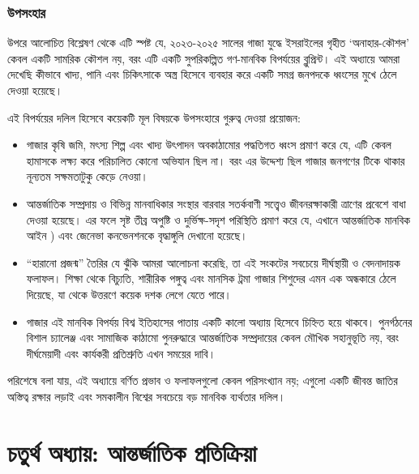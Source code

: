 \subsubsection{উপসংহার}\label{ux989ux9aaux9b8ux9b9ux9b0-ux98fux995ux99f-ux997ux9a3-ux9aeux9a8ux9acux995-ux9acux9aaux9b0ux9afux9dfux9b0-ux9a6ux9b2ux9b2}

উপরে আলোচিত বিশ্লেষণ থেকে এটি স্পষ্ট যে, ২০২৩-২০২৫ সালের গাজা যুদ্ধে ইসরাইলের
গৃহীত `অনাহার-কৌশল' কেবল একটি সামরিক কৌশল নয়, বরং এটি একটি সুপরিকল্পিত
গণ-মানবিক বিপর্যয়ের ব্লুপ্রিন্ট। এই অধ্যায়ে আমরা দেখেছি কীভাবে খাদ্য, পানি এবং
চিকিৎসাকে অস্ত্র হিসেবে ব্যবহার করে একটি সমগ্র জনপদকে ধ্বংসের মুখে ঠেলে দেওয়া
হয়েছে।

এই বিপর্যয়ের দলিল হিসেবে কয়েকটি মূল বিষয়কে উপসংহারে গুরুত্ব দেওয়া প্রয়োজন:

\begin{itemize}
\item
  গাজার কৃষি জমি, মৎস্য শিল্প এবং খাদ্য উৎপাদন
  অবকাঠামোর পদ্ধতিগত ধ্বংস প্রমাণ করে যে, এটি কেবল হামাসকে লক্ষ্য করে
  পরিচালিত কোনো অভিযান ছিল না। বরং এর উদ্দেশ্য ছিল গাজার জনগণের টিকে থাকার
  নূন্যতম সক্ষমতাটুকু কেড়ে নেওয়া।
\item
  আন্তর্জাতিক সম্প্রদায় ও বিভিন্ন মানবাধিকার
  সংস্থার বারবার সতর্কবাণী সত্ত্বেও জীবনরক্ষাকারী ত্রাণের প্রবেশে বাধা দেওয়া
  হয়েছে। এর ফলে সৃষ্ট তীব্র অপুষ্টি ও দুর্ভিক্ষ-সদৃশ পরিস্থিতি প্রমাণ করে যে, এখানে
  আন্তর্জাতিক মানবিক আইন ) এবং জেনেভা কনভেনশনকে বৃদ্ধাঙ্গুলি দেখানো হয়েছে।
\item
  ``হারানো প্রজন্ম'' তৈরির যে ঝুঁকি
  আমরা আলোচনা করেছি, তা এই সংকটের সবচেয়ে দীর্ঘস্থায়ী ও বেদনাদায়ক ফলাফল।
  শিক্ষা থেকে বিচ্যুতি, শারীরিক পঙ্গুত্ব এবং মানসিক ট্রমা গাজার শিশুদের এমন এক
  অন্ধকারে ঠেলে দিয়েছে, যা থেকে উত্তরণে কয়েক দশক লেগে যেতে পারে।
\item
  গাজার এই মানবিক বিপর্যয় বিশ্ব ইতিহাসের
  পাতায় একটি কালো অধ্যায় হিসেবে চিহ্নিত হয়ে থাকবে। পুনর্গঠনের বিশাল চ্যালেঞ্জ
  এবং সামাজিক কাঠামো পুনরুদ্ধারে আন্তর্জাতিক সম্প্রদায়ের কেবল মৌখিক সহানুভূতি নয়,
  বরং দীর্ঘমেয়াদী এবং কার্যকরী প্রতিশ্রুতি এখন সময়ের দাবি।
\end{itemize}

পরিশেষে বলা যায়, এই অধ্যায়ে বর্ণিত প্রভাব ও ফলাফলগুলো কেবল পরিসংখ্যান নয়;
এগুলো একটি জীবন্ত জাতির অস্তিত্ব রক্ষার লড়াই এবং সমকালীন বিশ্বের সবচেয়ে বড়
মানবিক ব্যর্থতার দলিল।

\section{চতুর্থ অধ্যায়: আন্তর্জাতিক প্রতিক্রিয়া}\label{ux9aaux99eux99aux9ae-ux985ux9a7ux9afux9df-ux986ux9a8ux9a4ux9b0ux99cux9a4ux995-ux9aaux9b0ux9a4ux995ux9b0ux9df}

